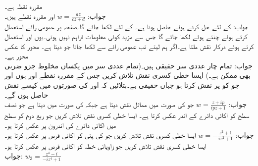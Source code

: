 \quad
{} مقررہ نقطہ ہے۔\\
جواب:\quad
$w=\tfrac{az}{cz+d}$
\quad
{}  اور  مقررہ نقطے ہیں۔\\
جواب:\quad
{} کے لئے حل کرتے ہوئے  حاصل ہوتا ہے۔ کے لئے  لکھا جائے گا۔صفحہ  پر عمومی رائے استعمال کرتے ہوئے  چنتے ہوئے  لکھا جائے گا جس سے مزید کوئی معلومات فراہم نہیں ہوتی۔یوں  اور  استعمال کرتے ہوئے درکار نقش  ملتا ہے۔اگر ہم  لیتے تب عمومی رائے سے  لکھا جاتا جو  دیتا ہے۔
\quad
{} محور کا عکس  محور ہے۔\\
جواب:\quad
تمام چار عددی سر حقیقی ہیں۔(تمام عددی سر میں یکساں مخلوط جزو ضربی بھی ممکن ہے۔)
\quad
ایسا خطی کسری نقش تلاش  کریں جس کے مقررہ نقطے  اور  ہوں اور جو  کو  پر نقش کرتا ہو جہاں  حقیقی ہے۔بتلائیں کہ  اور  کی صورتوں میں کیسے نقش حاصل ہوں گے۔\\
جواب:\quad
$w=\tfrac{z+ip}{ipz+1}$
جو  کی صورت میں مماثل نقش  دیتا ہے جبکہ  کی صورت میں  دیتا ہے جو نصف سطح کو اکائی دائرے کے اندر عکس کرتا ہے۔
\quad
ایسا خطی کسری نقش تلاش کریں جو ربع دوم کو  سطح میں اکائی دائرے کی اندرون پر عکس کرتا ہو۔\\
جواب:\quad
$w=-\tfrac{z^2+1}{iz^2+1}$ 
\quad
ایسا خطی کسری نقش  تلاش کریں جو  کی پٹی کو اکائی قرص  پر عکس کرتا ہو۔
\quad
ایسا خطی کسری نقش  تلاش کریں جو زاویائی خطہ  کو اکائی قرص  پر عکس کرتا ہو۔\\
جواب:\quad
 $w_3=\tfrac{z^4-i}{-iz^4+1}$


